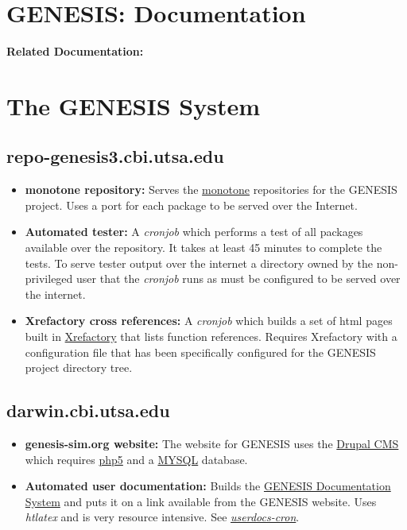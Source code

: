 \documentclass[12pt]{article}
\begin{document}
\section*{GENESIS: Documentation}

{\bf Related Documentation:}

\section*{The GENESIS System}

\subsection*{\bf repo-genesis3.cbi.utsa.edu}

\begin{itemize}

\item {\bf monotone repository:} Serves the \href{http://www.monotone.ca/}{monotone} repositories for the GENESIS project. Uses a port for each package to be served over the Internet.

\item {\bf Automated tester:} A {\it cronjob} which performs a test of all packages available over the repository.  It takes at least 45 minutes to complete the tests. To serve tester output over the internet a directory owned by the non-privileged user that the {\it cronjob} runs as must be configured to be served over the internet.

\item {\bf Xrefactory cross references:} A {\it cronjob} which builds a set of html pages built in \href{http://www.xref-tech.com/xrefactory/main.html}{Xrefactory} that lists function references.  Requires Xrefactory with a configuration file that has been specifically configured for the GENESIS project directory tree. 

\end{itemize}

\subsection*{\bf darwin.cbi.utsa.edu}

\begin{itemize}

\item {\bf genesis-sim.org website:} The website for GENESIS uses the \href{http://drupal.org/}{Drupal CMS} which requires \href{http://www.php.net/}{php5} and a \href{http://www.mysql.com/}{MYSQL} database.

\item {\bf Automated user documentation:} Builds the \href{../documentation-overview/documentation-overview.tex}{GENESIS Documentation System} and puts it on a link available from the GENESIS website.  Uses {\it htlatex} and is very resource intensive.  See \href{../userdocs-cron/userdocs-cron.tex}{\it userdocs-cron}.

\end{itemize}
\end{document}
